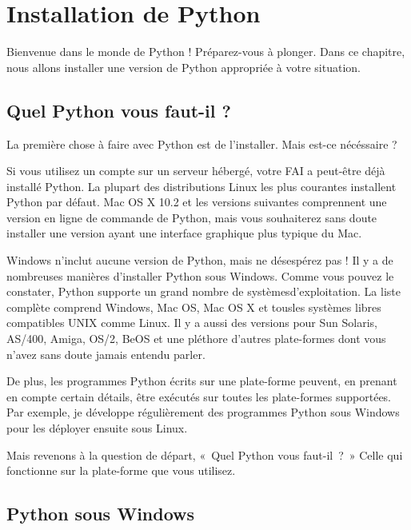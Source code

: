 \chapter{Installation de Python}\label{Installation de Python}

Bienvenue dans le monde de Python ! Préparez-vous à plonger. Dans ce chapitre, nous allons installer une version de Python appropriée à votre situation.

\section{Quel Python vous faut-il ?} \label{QuelPythonVousFautil}

La première chose à faire avec Python est de l'installer. Mais est-ce nécéssaire ?

\medskip
Si vous utilisez un compte sur un serveur hébergé, votre FAI a peut-être déjà installé Python. La plupart des distributions Linux les plus courantes installent Python par défaut. Mac OS X 10.2 et les versions suivantes comprennent une version en ligne de commande de Python, mais vous souhaiterez sans doute installer une version ayant une interface graphique plus typique du Mac.

Windows n'inclut aucune version de Python, mais ne désespérez pas ! Il y a de nombreuses manières d'installer Python sous Windows. Comme vous pouvez le constater, Python supporte un grand nombre de systèmesd'exploitation. La liste complète comprend Windows, Mac OS, Mac OS X et tousles systèmes libres compatibles UNIX comme Linux. Il y a aussi des versions pour Sun Solaris, AS/400, Amiga, OS/2, BeOS et une pléthore d'autres plate-formes dont vous n'avez sans doute jamais entendu parler.

De plus, les programmes Python écrits sur une plate-forme peuvent, en prenant en compte certain détails, être exécutés sur toutes les plate-formes supportées. Par exemple, je développe régulièrement des programmes Python sous Windows pour les déployer ensuite sous Linux.

\medskip
Mais revenons à la question de départ, «~Quel Python vous faut-il~?~» Celle qui fonctionne sur la plate-forme que vous utilisez.

\section {Python sous Windows}\label{Python sous Windows}

